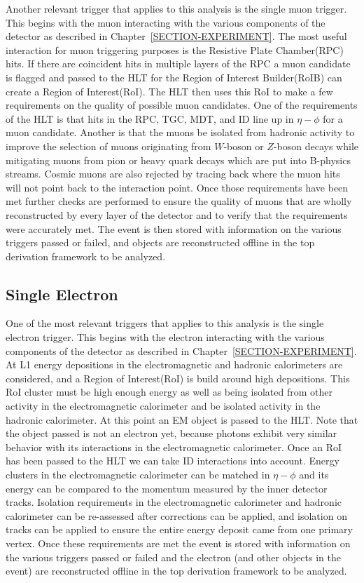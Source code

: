 Another relevant trigger that applies to this analysis is the single muon trigger. This begins with the muon interacting with the various components of the detector as described in Chapter~\ref{SECTION-EXPERIMENT}. The most useful interaction for muon triggering purposes is the Resistive Plate Chamber(RPC) hits. If there are coincident hits in multiple layers of the RPC a muon candidate is flagged and passed to the HLT for the Region of Interest Builder(RoIB) can create a Region of Interest(RoI). The HLT then uses this RoI to make a few requirements on the quality of possible muon candidates. One of the requirements of the HLT is that hits in the RPC, TGC, MDT, and ID line up in $\eta-\phi$ for a muon candidate. Another is that the muons be isolated from hadronic activity to improve the selection of muons originating from $W$-boson or $Z$-boson decays while mitigating muons from pion or heavy quark decays which are put into B-physics streams. Cosmic muons are also rejected by tracing back where the muon hits will not point back to the interaction point. Once those requirements have been met further checks are performed to ensure the quality of muons that are wholly reconstructed by every layer of the detector and to verify that the requirements were accurately met. The event is then stored with information on the various triggers passed or failed, and objects are reconstructed offline in the top derivation framework to be analyzed. ~\cite{TrigProposal}

\subsection{Single Electron}
\label{SECTION-TRIGGERS-1e}

One of the most relevant triggers that applies to this analysis is the single electron trigger. This begins with the electron interacting with the various components of the detector as described in Chapter~\ref{SECTION-EXPERIMENT}. At L1 energy depositions in the electromagnetic and hadronic calorimeters are considered, and a Region of Interest(RoI) is build around high depositions. This RoI cluster must be high enough energy as well as being isolated from other activity in the electromagnetic calorimeter and be isolated  activity in the hadronic calorimeter. At this point an EM object is passed to the HLT. Note that the object passed is not an electron yet, because photons exhibit very similar behavior with its interactions in the electromagnetic calorimeter. Once an RoI has been passed to the HLT we can take ID interactions into account. Energy clusters in the electromagnetic calorimeter can be matched in $\eta-\phi$ and its energy can be compared to the momentum measured by the inner detector tracks. Isolation requirements in the electromagnetic calorimeter and hadronic calorimeter can be re-assessed after corrections can be applied, and isolation on tracks can be applied to ensure the entire energy deposit came from one primary vertex. Once these requirements are met the event is stored with information on the various triggers passed or failed and the electron (and other objects in the event) are reconstructed offline in the top derivation framework to be analyzed. ~\cite{TrigProposal}

